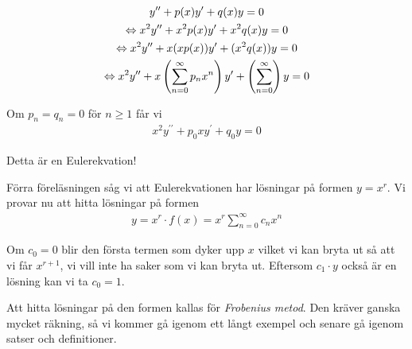 \begin{equation*}
  \begin{gathered}
    y^{\prime\prime}+p(x)y^{\prime}+q(x)y=0\\
    \Leftrightarrow x^2y^{\prime\prime}+x^2p(x)y^{\prime}+x^2q(x)y=0\\
    \Leftrightarrow x^2y^{\prime\prime}+x(xp(x))y^{\prime}+(x^2q(x))y=0\\
    \Leftrightarrow x^2y^{\prime\prime}+x\left(\sum_{n=0}^{\infty}p_nx^n\right)y^{\prime}+\left(\sum_{n=0}^{\infty}\right)y=0
  \end{gathered}
\end{equation*}
\par\bigskip
\noindent Om $p_n=q_n=0$ för $n\geq1$ får vi
\begin{equation*}
  \begin{gathered}
    x^2y^{\prime\prime}+p_0xy^{\prime}+q_0y=0
  \end{gathered}
\end{equation*}\par
\noindent Detta är en Eulerekvation!
\par\bigskip
\noindent Förra föreläsningen såg vi att Eulerekvationen har lösningar på formen $y=x^r$. Vi provar nu att hitta lösningar på formen
\begin{equation*}
  \begin{gathered}
    y=x^r\cdot f(x)=x^r\sum_{n=0}^{\infty}c_nx^n
  \end{gathered}
\end{equation*}\par
\noindent Om $c_0=0$ blir den första termen som dyker upp $x$ vilket vi kan bryta ut så att vi får $x^{r+1}$, vi vill inte ha saker som vi kan bryta ut. Eftersom $c_1\cdot y$ också är en lösning kan vi ta $c_0=1$.\par
\noindent Att hitta lösningar på den formen kallas för \textit{Frobenius metod}. Den kräver ganska mycket räkning, så vi kommer gå igenom ett långt exempel och senare gå igenom satser och definitioner.
\par\bigskip
